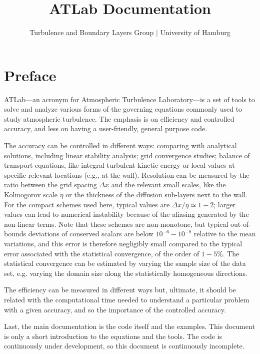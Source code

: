 \documentclass[a4paper,11pt]{book}
\title{{\bf AT}\textcolor{black!50}{Lab} Documentation}
\author{Turbulence and Boundary Layers Group $|$ University of Hamburg}
\begin{document}
\frontmatter
\pagestyle{empty}
\maketitle
\tableofcontents

\setlength{\parskip}{0.5\baselineskip}
%

\chapter*{Preface}
\sloppy

ATLab---an acronym for Atmospheric Turbulence Laboratory---is a set of tools to solve and analyze various forms of the governing equations commonly used to study atmospheric turbulence. The emphasis is on efficiency and controlled accuracy, and less on having a user-friendly, general purpose code.

The accuracy can be controlled in different ways: comparing with analytical solutions, including linear stability analysis; grid convergence studies; balance of transport equations, like integral turbulent kinetic energy or local values at specific relevant locations (e.g., at the wall). Resolution can be measured by the ratio between the grid spacing $\Delta x$ and the relevant small scales, like the Kolmogorov scale $\eta$ or the thickness of the diffusion sub-layers next to the wall. For the compact schemes used here, typical values are $\Delta x/\eta\simeq 1-2$; larger values can lead to numerical instability because of the aliasing generated by the non-linear terms. Note that these schemes are non-monotone, but typical out-of-bounds deviations of conserved scalars are below $10^{-6}-10^{-8}$ relative to the mean variations, and this error is therefore negligibly small compared to the typical error associated with the statistical convergence, of the order of $1-5$\%. The statistical convergence can be estimated by varying the sample size of the data set, e.g. varying the domain size along the statistically homogeneous directions. 

The efficiency can be measured in different ways but, ultimate, it should be related with the computational time needed to understand a particular problem with a given accuracy, and so the importance of the controlled accuracy. 

Last, the main documentation is the code itself and the examples. This document is only a short introduction to the equations and the tools. The code is continuously under development, so this document is continuously incomplete.
\end{document}
